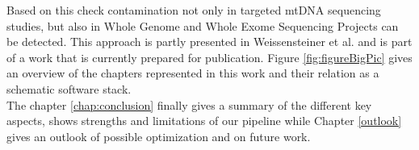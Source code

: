  Based on this check contamination not only in targeted mtDNA sequencing studies, but also in Whole Genome and Whole Exome Sequencing Projects can be detected. This approach is partly presented in Weissensteiner et al. \cite{Weissensteiner2016b} and is part of a work that is currently prepared for publication. Figure \ref{fig:figureBigPic} gives an overview of the chapters represented in this work and their relation as a schematic software stack.
\\ 
The chapter \ref{chap:conclusion} finally gives a summary of the different key aspects, shows strengths and limitations of our pipeline while Chapter \ref{outlook} gives an outlook of possible optimization and on future work.



